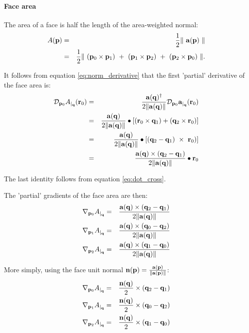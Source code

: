 
\paragraph{Face area}
\label{sec:facearea}

The area of a face is half the length of the area-weighted normal:
\begin{eqnarray}
A({\mathbf p})
& = & {1 \over 2} \| \ {\mathbf a}({\mathbf p}) \ \|  \\
& = & {1 \over 2} \| \ ({\mathbf p}_0 \times {\mathbf p}_1) \ + \ ({\mathbf p}_1 \times {\mathbf p}_2) \ + \ ({\mathbf p}_2 \times {\mathbf p}_0) \ \|.
\nonumber
\end{eqnarray}

It follows from equation \ref{eq:norm_derivative}
that the first 'partial' derivative of the face area is:
\begin{eqnarray}
\label{eq:area_partial_derivative}
\Dd{\p_0}{A}{\q}{\r_0}
& = &
{{\a(\q)^\dagger} \over {2\|\a(\q)\|}}
{\Dd{\p_0}{\a}{\q}{\r_0}}  \\
& = &
{{\a(\q)} \over {2\|\a(\q)\|}}
\bullet
\left[(\r_0 \times \q_1) + (\q_2 \times \r_0)\right] \nonumber \\
& = &
{{\a(\q)} \over {2\|\a(\q)\|}}
\bullet
\left[(\q_2 - \q_1) \ \times \  \r_0)\right] \nonumber \\
& = &
{{\a(\q) \times (\q_2 - \q_1)} \over {2\|\a(\q)\|}}
\bullet
\r_0 \nonumber
\end{eqnarray}

The last identity follows from equation \ref{eq:dot_cross}.

The 'partial' gradients of the face area are then:
\begin{eqnarray}
{\mathbf \nabla}_{{\mathbf p}_0}{{A}}_{\mid_{{\mathbf q}}} & = & {{{\mathbf a}({\mathbf q}) \times ({\mathbf q}_2 - {\mathbf q}_1)} \over {2\|{\mathbf a}({\mathbf q})\|}} \\
{\mathbf \nabla}_{{\mathbf p}_1}{{A}}_{\mid_{{\mathbf q}}} & = & {{{\mathbf a}({\mathbf q}) \times ({\mathbf q}_0 - {\mathbf q}_2)} \over {2\|{\mathbf a}({\mathbf q})\|}} \nonumber \\
{\mathbf \nabla}_{{\mathbf p}_2}{{A}}_{\mid_{{\mathbf q}}} & = & {{{\mathbf a}({\mathbf q}) \times ({\mathbf q}_1 - {\mathbf q}_0)} \over {2\|{\mathbf a}({\mathbf q})\|}} \nonumber
\end{eqnarray}

More simply, using the face unit normal \( {\mathbf n}({\mathbf p})  =  {{{\mathbf a}({\mathbf p})} \over {\| {\mathbf a}({\mathbf p}) \|}} \):
\begin{eqnarray}
\label{eq:area_gradient}
\Gc{\p_0}{A}{\q} & = & \frac{\n(\q)}{2} \times (\q_2 - \q_1) \\
\Gc{\p_1}{A}{\q} & = & \frac{\n(\q)}{2} \times (\q_0 - \q_2) \nonumber \\
\Gc{\p_2}{A}{\q} & = & \frac{\n(\q)}{2} \times (\q_1 - \q_0) \nonumber
\end{eqnarray}

